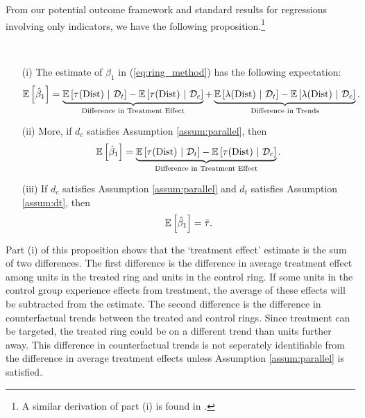 \documentclass[10pt]{article}
\newcommand{\dist}{\text{Dist}}
\begin{document}
From our potential outcome framework and standard results for regressions involving only indicators, we have the following proposition.\footnote{A similar derivation of part (i) is found in \citet{Sullivan_2017}.}

\begin{proposition}\label{prop:ring_decomp}     
    \par~\par
    \begin{enumerate}
        \item[(i)] The estimate of $\beta_1$ in (\ref{eq:ring_method}) has the following expectation:
        \[
            \expec{\hat{\beta}_1} = 
            \underbrace{\condexpec{\tau(\dist)}{\mathcal{D}_t} - \condexpec{\tau(\dist)}{\mathcal{D}_c} }_{\text{Difference in Treatment Effect}} 
            + \underbrace{\condexpec{\lambda(\dist)}{\mathcal{D}_t} - \condexpec{\lambda(\dist)}{\mathcal{D}_c} }_{\text{Difference in Trends}}.
        \]
        
        \item[(ii)] More, if $d_c$ satisfies Assumption \ref{assum:parallel}, then
        \[ 
            \expec{\hat{\beta}_1} = 
            \underbrace{\condexpec{\tau(\dist)}{\mathcal{D}_t} - \condexpec{\tau(\dist)}{\mathcal{D}_c} }_{\text{Difference in Treatment Effect}}.
        \] 
    
        \item[(iii)] If $d_c$ satisfies Assumption \ref{assum:parallel} and $d_t$ satisfies Assumption \ref{assum:dt}, then
        \[ 
            \mathbb{E}\left[\hat{\beta}_1\right] = \bar{\tau}.
        \]
    \end{enumerate}
    
    
\end{proposition}

Part (i) of this proposition shows that the `treatment effect' estimate is the sum of two differences. The first difference is the difference in average treatment effect among units in the treated ring and units in the control ring. If some units in the control group experience effects from treatment, the average of these effects will be subtracted from the estimate. The second difference is the difference in counterfactual trends between the treated and control rings. Since treatment can be targeted, the treated ring could be on a different trend than units further away. This difference in counterfactual trends is not seperately identifiable from the difference in average treatment effects unless Assumption \ref{assum:parallel} is satisfied. 
\end{document}
